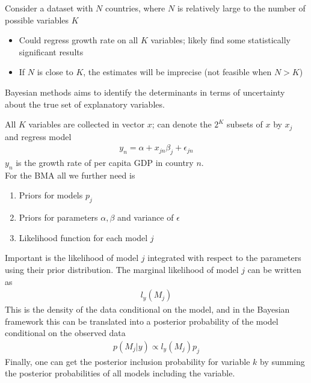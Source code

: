 \documentclass{beamer}
\begin{document}
\begin{frame}
  Consider a dataset with $N$ countries, where $N$ is relatively large to the number of possible variables $K$
  \begin{itemize}
    \item Could regress growth rate on all $K$ variables; likely find some statistically significant results
    \item If $N$ is close to $K$, the estimates will be imprecise (not feasible when $N>K$)
  \end{itemize}
  \medskip
  Bayesian methods aims to identify the determinants in terms of uncertainty about the true set of explanatory variables. 
\end{frame}

\begin{frame}
  All $K$ variables are collected in vector $x$; can denote the $2^K$ subsets of $x$ by $x_j$ and regress model
  \begin{align}
    y_n=\alpha +x_{jn}\beta_j + \epsilon_{jn}
  \end{align}
  $y_n$ is the growth rate of per capita GDP in country $n$. \\
  For the BMA all we further need is 
  \begin{enumerate}
    \item Priors for models $p_j$
    \item Priors for parameters $\alpha,\beta$ and variance of $\epsilon$
    \item Likelihood function for each model $j$
  \end{enumerate}
\end{frame}

\begin{frame}
  Important is the likelihood of model $j$ integrated with respect to the parameters using their prior distribution.
  The marginal likelihood of model $j$ can be written as
  \begin{align}
    l_y(M_j)
  \end{align}
  This is the density of the data conditional on the model, and in the Bayesian framework this can be translated into a posterior probability of the model conditional on the observed data
  \begin{align}
    p(M_j|y) \propto l_y(M_j)p_j
  \end{align}
  \medskip
  Finally, one can get the posterior inclusion probability for variable $k$ by summing the posterior probabilities of all models including the variable.
\end{frame}
\end{document}
